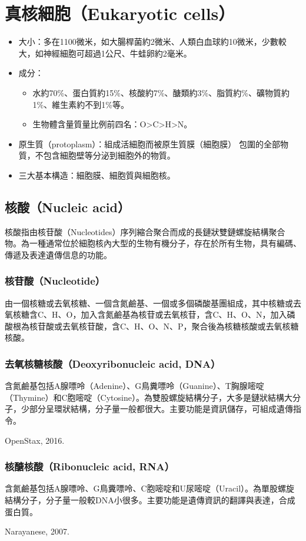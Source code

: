 \documentclass[a4paper,12pt]{report}
\begin{document}
\section{真核細胞（Eukaryotic cells）}
\bct\bfH\ctr{}\ef\FB\ect
{}
\begin{itemize}
  \item 大小：多在1100微米，如大腸桿菌約2微米、人類白血球約10微米，少數較大，如神經細胞可超過1公尺、牛蛙卵約2毫米。
  \item 成分：
  \begin{itemize}
    \item 水約70\%、蛋白質約15\%、核酸約7\%、醣類約3\%、脂質約\%、礦物質約1\%、維生素約不到1\%等。
    \item 生物體含量質量比例前四名：O>C>H>N。
\end{itemize}
  \item 原生質（protoplasm）：組成活細胞而被原生質膜（細胞膜） 包圍的全部物質，不包含細胞壁等分泌到細胞外的物質。
  \item 三大基本構造：細胞膜、細胞質與細胞核。
\end{itemize}
\subsection{核酸（Nucleic acid）}
核酸指由核苷酸（Nucleotides）序列縮合聚合而成的長鏈狀雙鏈螺旋結構聚合物。為一種通常位於細胞核內大型的生物有機分子，存在於所有生物，具有編碼、傳遞及表達遺傳信息的功能。
\subsubsection{核苷酸（Nucleotide）}
由一個核糖或去氧核糖、一個含氮鹼基、一個或多個磷酸基團組成，其中核糖或去氧核糖含C、H、O，加入含氮鹼基為核苷或去氧核苷，含C、H、O、N，加入磷酸根為核苷酸或去氧核苷酸，含C、H、O、N、P，聚合後為核糖核酸或去氧核糖核酸。
\subsubsection{去氧核糖核酸（Deoxyribonucleic acid, DNA）}
含氮鹼基包括A腺嘌呤（Adenine）、G鳥糞嘌呤（Guanine）、T胸腺嘧啶（Thymine）和C胞嘧啶（Cytosine）。為雙股螺旋結構分子，大多是鏈狀結構大分子，少部分呈環狀結構，分子量一般都很大。主要功能是資訊儲存，可組成遺傳指令。
\bct\bfH\ctr{}\caption{OpenStax, 2016.}\ef\FB\ect
\subsubsection{核醣核酸（Ribonucleic acid, RNA）}
含氮鹼基包括A腺嘌呤、G鳥糞嘌呤、C胞嘧啶和U尿嘧啶（Uracil）。為單股螺旋結構分子，分子量一般較DNA小很多。主要功能是遺傳資訊的翻譯與表達，合成蛋白質。
\bct\bfH\ctr{}\caption{Narayanese, 2007.}\ef\FB\ect
\end{document}
